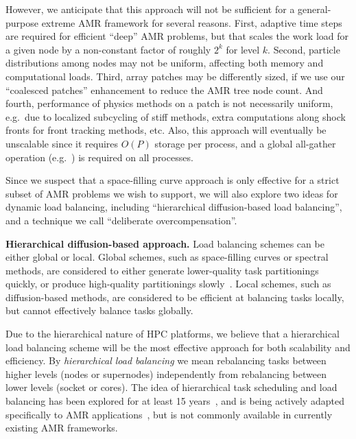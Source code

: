 \documentclass[10pt,twocolumn]{article}
\begin{document}
However, we anticipate that this approach will not be sufficient for a
general-purpose extreme AMR framework for several reasons.
%
First, adaptive time steps are required for efficient ``deep'' AMR
problems, but that scales the work load for a given node by a
non-constant factor of roughly $2^k$ for level $k$.
%
Second, particle distributions among nodes may not be uniform, affecting both memory and computational loads.
%
Third, array patches may be differently sized, if we use our
``coalesced patches'' enhancement to reduce the AMR tree node count.
%
And fourth, performance of physics methods on a patch is not
necessarily uniform, e.g.~due to localized subcycling of stiff
methods, extra computations along shock fronts for front tracking
methods, etc.  
%
Also, this approach will eventually be unscalable since it
requires $O(P)$ storage per process, and a global all-gather
operation (e.g.~) is required on all processes.

Since we suspect that a space-filling curve approach is only effective
for a strict subset of AMR problems we wish to support, we will also
explore two ideas for dynamic load balancing, including ``hierarchical
diffusion-based load balancing'', and a technique we call
``deliberate overcompensation''.

\textbf{Hierarchical diffusion-based approach.} Load balancing
schemes can be either global or local.  Global schemes, such as
space-filling curves or spectral methods, are considered to either
generate lower-quality task partitionings quickly, or produce
high-quality partitionings slowly~\cite{MeMo09}.  Local schemes,
such as diffusion-based methods, are considered to be efficient
at balancing tasks locally, but cannot effectively balance tasks
globally.

Due to the hierarchical nature of HPC platforms, we believe that a
hierarchical load balancing scheme will be the most effective approach
for both scalability and efficiency.  By \textit{hierarchical load
  balancing} we mean rebalancing tasks between higher levels (nodes or
supernodes) independently from rebalancing between lower levels
(socket or cores).  The idea of hierarchical task scheduling and load
balancing has been explored for at least 15 years~\cite{AhGh94}, and
is being actively adapted specifically to AMR
applications~\cite{LaTa06}, but is not commonly available in currently
existing AMR frameworks.
\end{document}
